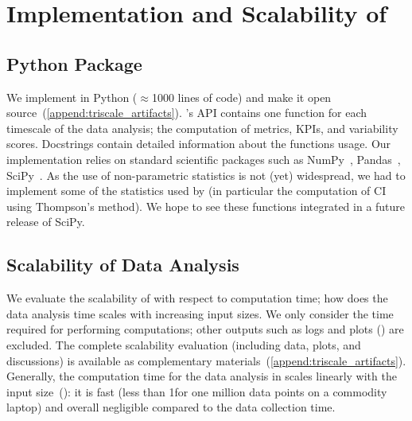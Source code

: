 
\section{Implementation and Scalability of \triscale}
\label{sec:triscale_implementation}

\subsection{Python Package}

We implement \triscale in Python ($\approx$1000 lines of code) and make it open source~(\cref{append:triscale_artifacts}).
\triscale's API contains one function for each timescale of the data analysis; \ie the computation of metrics, KPIs, and variability scores.
Docstrings contain detailed information about the functions usage.
Our implementation relies on standard scientific packages such as NumPy~\cite{numpy}, Pandas~\cite{pandas}, SciPy~\cite{scipy}.
As the use of non-parametric statistics is not (yet) widespread, we had to implement some of the statistics used by \triscale (in particular the computation of CI using Thompson's method).
We hope to see these functions integrated in a future release of SciPy.



\subsection{Scalability of \triscale Data Analysis}
\label{subsec:scalability}

We evaluate the scalability of \triscale with respect to computation time; \ie how does the data analysis time scales with increasing input sizes.
We only consider the time required for performing computations; other outputs such as logs and plots (\eg {}) are excluded.
The complete scalability evaluation (including data, plots, and discussions) is available as complementary materials~(\cref{append:triscale_artifacts}).
Generally, the computation time for the data analysis in \triscale scales linearly with the input size~(): it is fast (less than 1\s for one million data points on a commodity laptop) and overall negligible compared to the data collection time.


